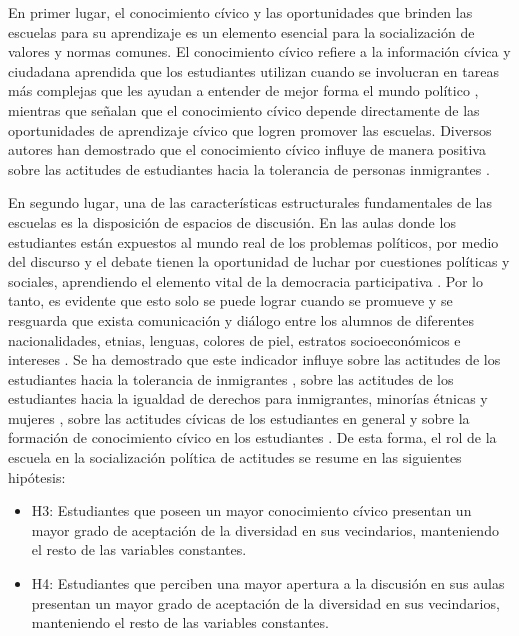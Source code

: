 \documentclass[12pt,twoside]{templates/facsothesis}
\begin{document}
En primer lugar, el conocimiento cívico y las oportunidades que brinden las escuelas para su aprendizaje es un elemento esencial para la socialización de valores y normas comunes. El conocimiento cívico refiere a la información cívica y ciudadana aprendida que los estudiantes utilizan cuando se involucran en tareas más complejas que les ayudan a entender de mejor forma el mundo político \citep{carstens_Overview_2018}, mientras que \citet{sampermans_Back_2020} señalan que el conocimiento cívico depende directamente de las oportunidades de aprendizaje cívico que logren promover las escuelas. Diversos autores han demostrado que el conocimiento cívico influye de manera positiva sobre las actitudes de estudiantes hacia la tolerancia de personas inmigrantes \citep{isac_Native_2012, groof_Influence_2008, torney-purta_How_2008}.

En segundo lugar, una de las características estructurales fundamentales de las escuelas es la disposición de espacios de discusión. En las aulas donde los estudiantes están expuestos al mundo real de los problemas políticos, por medio del discurso y el debate tienen la oportunidad de luchar por cuestiones políticas y sociales, aprendiendo el elemento vital de la democracia participativa \citep{campbell_Voice_2008}. Por lo tanto, es evidente que esto solo se puede lograr cuando se promueve y se resguarda que exista comunicación y diálogo entre los alumnos de diferentes nacionalidades, etnias, lenguas, colores de piel, estratos socioeconómicos e intereses \citep{riedemann_Desde_2020}. Se ha demostrado que este indicador influye sobre las actitudes de los estudiantes hacia la tolerancia de inmigrantes \citep{eckstein_school_2021, maurissen_Classroom_2020, groof_Influence_2008, isac_Native_2012}, sobre las actitudes de los estudiantes hacia la igualdad de derechos para inmigrantes, minorías étnicas y mujeres \citep{trevino_Influence_2018, trevino_Influence_2017}, sobre las actitudes cívicas de los estudiantes en general \citep[ \citet{trolian_shaping_2022}]{barber_Profiles_2020} y sobre la formación de conocimiento cívico en los estudiantes \citep{sampermans_Back_2020, barber_Immigrant_2015}. De esta forma, el rol de la escuela en la socialización política de actitudes se resume en las siguientes hipótesis:

\begin{itemize}
\item
  H3: Estudiantes que poseen un mayor conocimiento cívico presentan un mayor grado de aceptación de la diversidad en sus vecindarios, manteniendo el resto de las variables constantes.
\item
  H4: Estudiantes que perciben una mayor apertura a la discusión en sus aulas presentan un mayor grado de aceptación de la diversidad en sus vecindarios, manteniendo el resto de las variables constantes.
\end{itemize}
\end{document}
